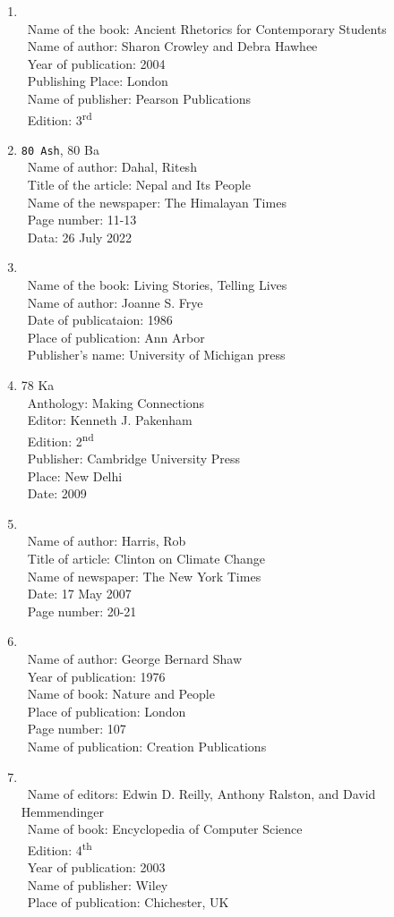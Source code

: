 \documentclass[12pt]{article}
\newcommand{\enter}{\\\textcolor{white}{1}}
\newcommand{\super}[1]{\textsuperscript{#1}}
\begin{document}
\begin{enumerate}
\begin{enumerate}
        \item {}
          \enter Name of the book: Ancient Rhetorics for Contemporary Students
          \enter Name of author: Sharon Crowley and Debra Hawhee
          \enter Year of publication: 2004
          \enter Publishing Place: London
          \enter Name of publisher: Pearson Publications
          \enter Edition: 3\super{rd}

        \item \texttt{80 Ash}, 80 Ba
          \enter Name of author: Dahal, Ritesh
          \enter Title of the article: Nepal and Its People
          \enter Name of the newspaper: The Himalayan Times
          \enter Page number: 11-13
          \enter Data: 26 July 2022

        \item {}
          \enter Name of the book: Living Stories, Telling Lives
          \enter Name of author: Joanne S. Frye
          \enter Date of publicataion: 1986
          \enter Place of publication: Ann Arbor
          \enter Publisher's name: University of Michigan press

        \item 78 Ka
          \enter Anthology: Making Connections
          \enter Editor: Kenneth J. Pakenham
          \enter Edition: 2\super{nd}
          \enter Publisher: Cambridge University Press
          \enter Place: New Delhi
          \enter Date: 2009

        \item {}
          \enter Name of author: Harris, Rob
          \enter Title of article: Clinton on Climate Change
          \enter Name of newspaper: The New York Times
          \enter Date: 17 May 2007
          \enter Page number: 20-21

        \item {}
          \enter Name of author: George Bernard Shaw
          \enter Year of publication: 1976
          \enter Name of book: Nature and People
          \enter Place of publication: London
          \enter Page number: 107
          \enter Name of publication: Creation Publications

        \item {}
          \enter Name of editors: Edwin D. Reilly, Anthony Ralston, and David Hemmendinger
          \enter Name of book: Encyclopedia of Computer Science
          \enter Edition: 4\super{th}
          \enter Year of publication: 2003
          \enter Name of publisher: Wiley
          \enter Place of publication: Chichester, UK


\end{enumerate}
\end{enumerate}
\end{document}
